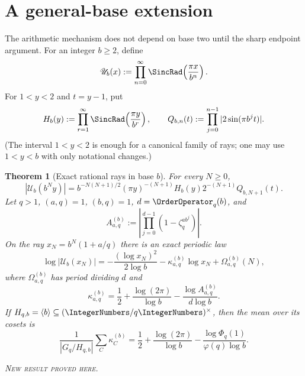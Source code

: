 \documentclass[11pt,oneside]{article}
\newtheorem{theorem}{Theorem}[section]
\theoremstyle{definition}
\theoremstyle{remark}
\newcommand{\newresult}{\textcolor{newgreen}{\textsc{New result proved here.}}}
\begin{document}
\section{A general-base extension}\label{p2:sec:general-base}

The arithmetic mechanism does not depend on base two until the sharp endpoint
argument. For an integer $b\ge2$, define
\begin{equation}
 \mathscr U_b(x):=\prod_{n=0}^{\infty}
 \SincRad\!\left(\frac{\pi x}{b^n}\right).
 \label{p2:eq:Ub}
\end{equation}
For $1<y<2$ and $t=y-1$, put
\begin{equation}
 H_b(y):=\prod_{r=1}^{\infty}\SincRad\!\left(\frac{\pi y}{b^r}\right),
 \qquad
 Q_{b,n}(t):=\prod_{j=0}^{n-1}|2\sin(\pi b^jt)|.
 \label{p2:eq:Hb-Qb}
\end{equation}
(The interval $1<y<2$ is enough for a canonical family of rays; one may use
$1<y<b$ with only notational changes.)

\begin{theorem}[Exact rational rays in base $b$]\label{p2:thm:base-b}
For every $N\ge0$,
\begin{equation}
 |\mathscr U_b(b^Ny)|
 =b^{-N(N+1)/2}(\pi y)^{-(N+1)}H_b(y)2^{-(N+1)}Q_{b,N+1}(t).
 \label{p2:eq:base-b-factorization}
\end{equation}
Let $q>1$, $(a,q)=1$, $(b,q)=1$, $d=\OrderOperator_q(b)$, and
\begin{equation}
 A_{a,q}^{(b)}:=\left|\prod_{j=0}^{d-1}
 (1-\zeta_q^{ab^j})\right|.
 \label{p2:eq:A-base-b}
\end{equation}
On the ray $x_N=b^N(1+a/q)$ there is an exact periodic law
\begin{equation}
 \log|\mathscr U_b(x_N)|
 =-\frac{(\log x_N)^2}{2\log b}
 -\kappa_{a,q}^{(b)}\log x_N+\Omega_{a,q}^{(b)}(N),
 \label{p2:eq:base-b-ray}
\end{equation}
where $\Omega_{a,q}^{(b)}$ has period dividing $d$ and
\begin{equation}
 \boxed{
 \kappa_{a,q}^{(b)}=\frac12+\frac{\log(2\pi)}{\log b}
 -\frac{\log A_{a,q}^{(b)}}{d\log b}.}
 \label{p2:eq:kappa-base-b}
\end{equation}
If $H_{q,b}=\langle b\rangle\subseteq(\IntegerNumbers/q\IntegerNumbers)^\times$, then the mean over its
cosets is
\begin{equation}
 \boxed{
 \frac1{|G_q/H_{q,b}|}\sum_C\kappa_C^{(b)}
 =\frac12+\frac{\log(2\pi)}{\log b}
 -\frac{\log\Phi_q(1)}{\varphi(q)\log b}.}
 \label{p2:eq:mean-base-b}
\end{equation}

\smallskip\noindent\newresult
\end{theorem}
\end{document}
